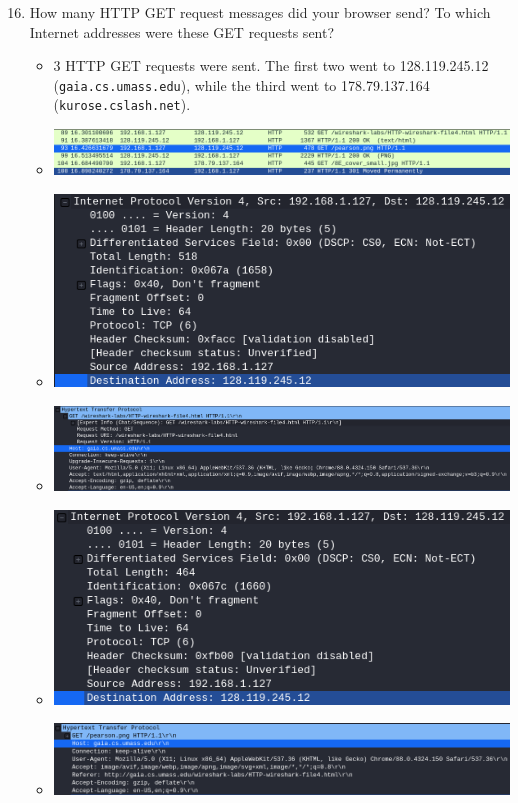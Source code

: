 \documentclass[11pt]{article}
\begin{document}
\begin{enumerate}
  \setcounter{enumi}{15}
\item How many HTTP GET request messages did your browser send?  To which
  Internet addresses were these GET requests sent?
  \begin{itemize}
  \item $3$ HTTP GET requests were sent.  The first two went to
    128.119.245.12 (\texttt{gaia.cs.umass.edu}), while the third went to
    178.79.137.164 (\texttt{kurose.cslash.net}).
  \item \includegraphics[width=\textwidth]{img/ws-embed-get-count}
  \item \includegraphics[width=\textwidth]{img/ws-embed-ip-1}
  \item \includegraphics[width=\textwidth]{img/ws-embed-host-1}
  \item \includegraphics[width=\textwidth]{img/ws-embed-ip-2}
  \item \includegraphics[width=\textwidth]{img/ws-embed-host-2}

\end{itemize}
\end{enumerate}
\end{document}
